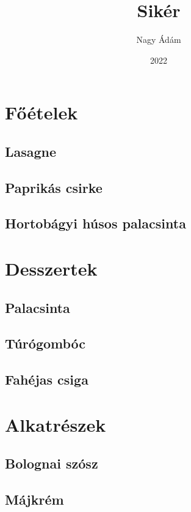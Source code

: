 \documentclass[11pt,a5paper,pagesize,openright]{book}
\title{Sikér}
\author{Nagy Ádám}
\date{2022}
\begin{document}
\frontmatter
\maketitle

\mainmatter


\chapter*{Főételek}
\section*{Lasagne}
\lipsum[1-4]

\section*{Paprikás csirke}
\section*{Hortobágyi húsos palacsinta}

\chapter*{Desszertek}
\section*{Palacsinta}
\section*{Túrógombóc}
\section*{Fahéjas csiga}


\chapter*{Alkatrészek}
\section*{Bolognai szósz}
\section*{Májkrém}
\end{document}
